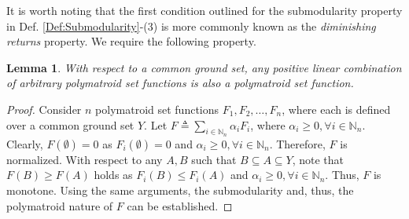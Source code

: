 \documentclass[letterpaper, 10 pt, conference]{ieeeconf}
\newcommand{\N}{\mathbb{N}}
\newtheorem{lemma}{Lemma}
\begin{document}
It is worth noting that the first condition outlined for the submodularity property in Def. \ref{Def:Submodularity}-(3) is more commonly known as the \emph{diminishing returns} property. We require the following property.

\begin{lemma}\label{Lm:LinearityOfSubmodularity}
With respect to a common ground set, any positive linear combination of arbitrary polymatroid set functions is also a polymatroid set function.    
\end{lemma}
\begin{proof}
Consider $n$ polymatroid set functions $F_1,F_2,\ldots,F_n$, where each is defined over a common ground set $Y$. Let $F\triangleq \sum_{i\in\N_n} \alpha_i F_i$, where $\alpha_i \geq 0, \forall i \in\N_n$. Clearly, $F(\emptyset)=0$ as $F_i(\emptyset)=0$ and $\alpha_i \geq 0, \forall i\in\N_n$. Therefore, $F$ is normalized. With respect to any $A,B$ such that $B \subseteq A \subseteq Y$, note that $F(B)\geq F(A)$ holds as $F_i(B) \leq F_i(A)$ and $\alpha_i \geq 0, \forall i\in\N_n$. Thus, $F$ is monotone. Using the same arguments, the submodularity and, thus, the polymatroid nature of $F$ can be established.
\end{proof}
\end{document}
